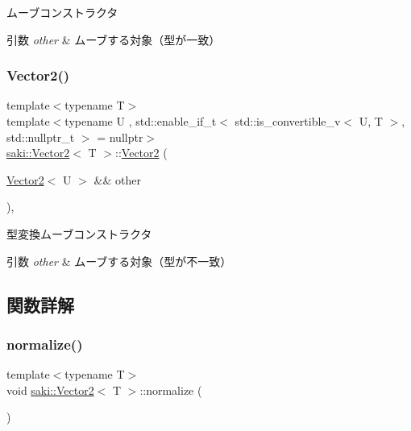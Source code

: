 ムーブコンストラクタ 


\begin{DoxyParams}{引数}
{\em other} & ムーブする対象（型が一致） \\
\hline
\end{DoxyParams}
\mbox{\label{classsaki_1_1_vector2_ab2677ccc77f16ad41792ccc158f22fa6}} 
\subsubsection{\texorpdfstring{Vector2()}{Vector2()}\hspace{0.1cm}{\footnotesize\ttfamily [7/7]}}
{\footnotesize\ttfamily template$<$typename T$>$ \\
template$<$typename U , std\+::enable\+\_\+if\+\_\+t$<$ std\+::is\+\_\+convertible\+\_\+v$<$ U, T $>$, std\+::nullptr\+\_\+t $>$  = nullptr$>$ \\
\mbox{\hyperlink{classsaki_1_1_vector2}{saki\+::\+Vector2}}$<$ T $>$\+::\mbox{\hyperlink{classsaki_1_1_vector2}{Vector2}} (\begin{DoxyParamCaption}\item[{\mbox{\hyperlink{classsaki_1_1_vector2}{Vector2}}$<$ U $>$ \&\&}]{other }\end{DoxyParamCaption})\hspace{0.3cm}{\ttfamily [inline]}, {\ttfamily [noexcept]}}



型変換ムーブコンストラクタ 


\begin{DoxyParams}{引数}
{\em other} & ムーブする対象（型が不一致） \\
\hline
\end{DoxyParams}


\subsection{関数詳解}
\mbox{\label{classsaki_1_1_vector2_a8267f8608ffad9796813856c05076d8c}} 
\subsubsection{\texorpdfstring{normalize()}{normalize()}}
{\footnotesize\ttfamily template$<$typename T$>$ \\
void \mbox{\hyperlink{classsaki_1_1_vector2}{saki\+::\+Vector2}}$<$ T $>$\+::normalize (\begin{DoxyParamCaption}{ }\end{DoxyParamCaption})\hspace{0.3cm}{\ttfamily [inline]}}



